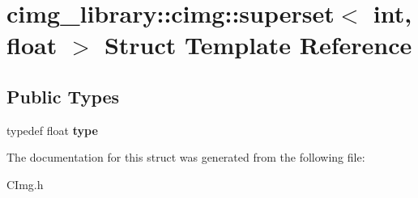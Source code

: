 \hypertarget{structcimg__library_1_1cimg_1_1superset_3_01int_00_01float_01_4}{\section{cimg\-\_\-library\-:\-:cimg\-:\-:superset$<$ int, float $>$ Struct Template Reference}
\label{structcimg__library_1_1cimg_1_1superset_3_01int_00_01float_01_4}
}
\subsection*{Public Types}
\begin{DoxyCompactItemize}
\item 
\hypertarget{structcimg__library_1_1cimg_1_1superset_3_01int_00_01float_01_4_a41b161d8880f9795d9822c2c42218dc9}{typedef float {\bfseries type}}\label{structcimg__library_1_1cimg_1_1superset_3_01int_00_01float_01_4_a41b161d8880f9795d9822c2c42218dc9}

\end{DoxyCompactItemize}


The documentation for this struct was generated from the following file\-:\begin{DoxyCompactItemize}
\item 
C\-Img.\-h\end{DoxyCompactItemize}
